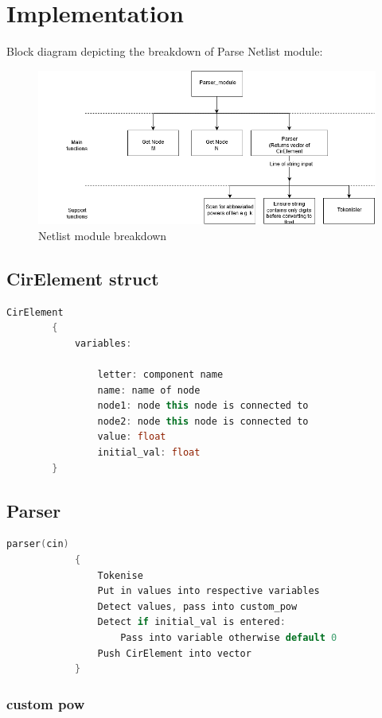 \documentclass[a4paper, titlepage]{article}
\begin{document}
    \section{Implementation}
    Block diagram depicting the breakdown of Parse Netlist module:
    \begin{figure}[h]
    \centering
    \includegraphics[width=145mm,scale=1]{Netlist breakdown}
    \caption{Netlist module breakdown}
    \label{fig:Netlist breakdown}
    \end{figure}
    \subsection{CirElement struct}
    \begin{lstlisting}[language=C++]
        CirElement 
        {
            variables:
    
                letter: component name
                name: name of node
                node1: node this node is connected to 
                node2: node this node is connected to
                value: float
                initial_val: float
        }
    \end{lstlisting}
    \subsection{Parser}
    \begin{lstlisting}[language=C++]
        parser(cin)
            {
                Tokenise
                Put in values into respective variables
                Detect values, pass into custom_pow
                Detect if initial_val is entered:
                    Pass into variable otherwise default 0
                Push CirElement into vector
            }
    \end{lstlisting}
    \subsubsection{custom pow}
\end{document}
